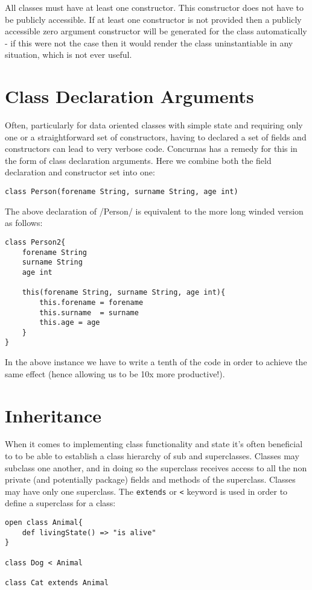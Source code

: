 \documentclass[conc-doc]{subfiles}
\begin{document}
All classes must have at least one constructor. This constructor does not have to be publicly accessible. If at least one constructor is not provided then a publicly accessible zero argument constructor will be generated for the class automatically - if this were not the case then it would render the class uninstantiable in any situation, which is not ever useful.

\section{Class Declaration Arguments}
Often, particularly for data oriented classes with simple state and requiring only one or a straightforward set of constructors, having to declared a set of fields and constructors can lead to very verbose code. Concurnas has a remedy for this in the form of class declaration arguments. Here we combine both the field declaration and constructor set into one:

\begin{lstlisting}
class Person(forename String, surname String, age int)
\end{lstlisting}

The above declaration of /Person/ is equivalent to the more long winded version as follows:
\begin{lstlisting}
class Person2{
	forename String
	surname String
	age int
	
	this(forename String, surname String, age int){
		this.forename = forename
		this.surname  = surname 
		this.age = age
	}
}
\end{lstlisting}

In the above instance we have to write a tenth of the code in order to achieve the same effect (hence allowing us to be 10x more productive!).

\section{Inheritance}
When it comes to implementing class functionality and state it's often beneficial to to be able to establish a class hierarchy of sub and superclasses. Classes may subclass one another, and in doing so the superclass receives access to all the non private (and potentially package) fields and methods of the superclass. Classes may have only one superclass. The \lstinline{extends} or \lstinline{<} keyword is used in order to define a superclass for a class:

\begin{lstlisting}
open class Animal{
	def livingState() => "is alive"
}

class Dog < Animal

class Cat extends Animal
\end{lstlisting}
\end{document}
